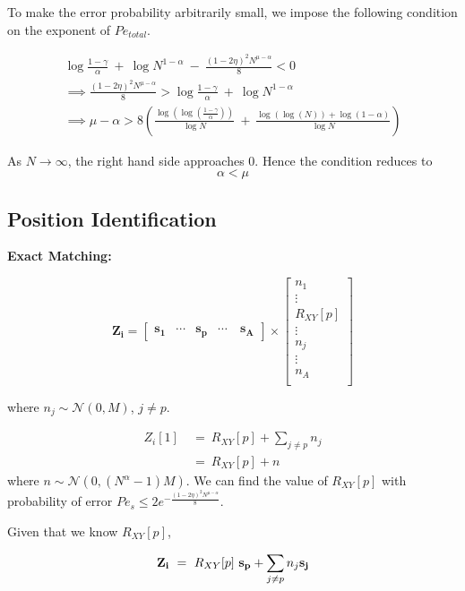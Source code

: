To make the error probability arbitrarily small, we impose the following condition on the exponent of $Pe_{total}$.

\[\begin{array}{ll}
 \log \frac{1-\gamma }{\alpha} \ + \ \log N^{1-\alpha} \  - \ \frac{(1-2\eta)^2N^{\mu-\alpha}}{8} < 0 \\
\implies \frac{(1-2\eta)^2N^{\mu-\alpha}}{8} >   \log \frac{1-\gamma }{\alpha} \ + \ \log N^{1-\alpha}\\
\implies \mu-\alpha > 8 (\frac{\log (\log(\frac{1-\gamma}{\alpha}))}{\log N}\ + \ \frac{\log (\log(N)) + \log (1- \alpha)}{\log N} )
\end{array}
\]

As $N \rightarrow \infty$, the right hand side approaches 0. Hence the condition reduces to 
\[ \alpha < \mu \]


\subsection{Position Identification}
{\bf Exact Matching:}

\[
\mathbf{Z_i} = \begin{bmatrix}
\mathbf{s_1}       & \cdots   & \mathbf{s_p} &\cdots \ &\mathbf{s_A}
\end{bmatrix} \times
    \begin{bmatrix}
n_1 \\
\vdots \\
R_{XY}[p]\\
\vdots\\
n_j \\
\vdots\\
n_{A}\\
\end{bmatrix}
\]


where $n_j \sim \mathcal{N}(0,M)$, $j \neq p$.

\[\begin{array}{ll}
Z_i[1] \ &= \ R_{XY}[p] + \sum_{j \neq p}n_j \\
         &= \ R_{XY}[p] + n 
\end{array}
\]
where $n \sim \mathcal{N}(0,(N^\alpha-1)M)$. We can find the value of $R_{XY}[p]$ with probability of error $Pe_s \leq 2 e^{- \frac{(1-2\eta)^2N^{\mu-\alpha}}{8}}$.

Given that we know $R_{XY}[p]$, 

\[ \mathbf{Z_i} \ = \ R_{XY}[p] ~ \mathbf{s_p}+ \sum_{j \neq p}n_j \mathbf{s_j} \\
\]

